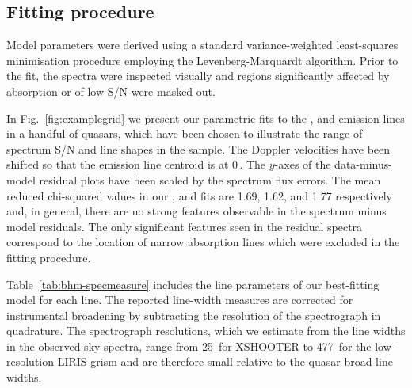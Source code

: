 \subsection{Fitting procedure}

Model parameters were derived using a standard variance-weighted least-squares minimisation procedure employing the Levenberg-Marquardt algorithm. 
Prior to the fit, the spectra were inspected visually and regions significantly affected by absorption or of low S/N were masked out.

In Fig.~\ref{fig:examplegrid} we present our parametric fits to the , \ha and \hb emission lines in a handful of quasars, which have been chosen to illustrate the range of spectrum S/N and line shapes in the sample.  
The Doppler velocities have been shifted so that the \ha emission line centroid is at 0\,\kms. 
The $y$-axes of the data-minus-model residual plots have been scaled by the spectrum flux errors.
The mean reduced chi-squared values in our \hans, \hb and  fits are 1.69, 1.62, and 1.77 respectively and, in general, there are no strong features observable in the spectrum minus model residuals. 
The only significant features seen in the residual  spectra correspond to the location of narrow absorption lines which were excluded in the fitting procedure.

Table~\ref{tab:bhm-specmeasure} includes the line parameters of our best-fitting model for each line.
The reported line-width measures are corrected for instrumental broadening by subtracting the resolution of the spectrograph in quadrature. 
The spectrograph resolutions, which we estimate from the line widths in the observed sky spectra, range from 25\kms\, for XSHOOTER to 477\kms\, for the low-resolution LIRIS grism and are therefore small relative to the quasar broad line widths.

